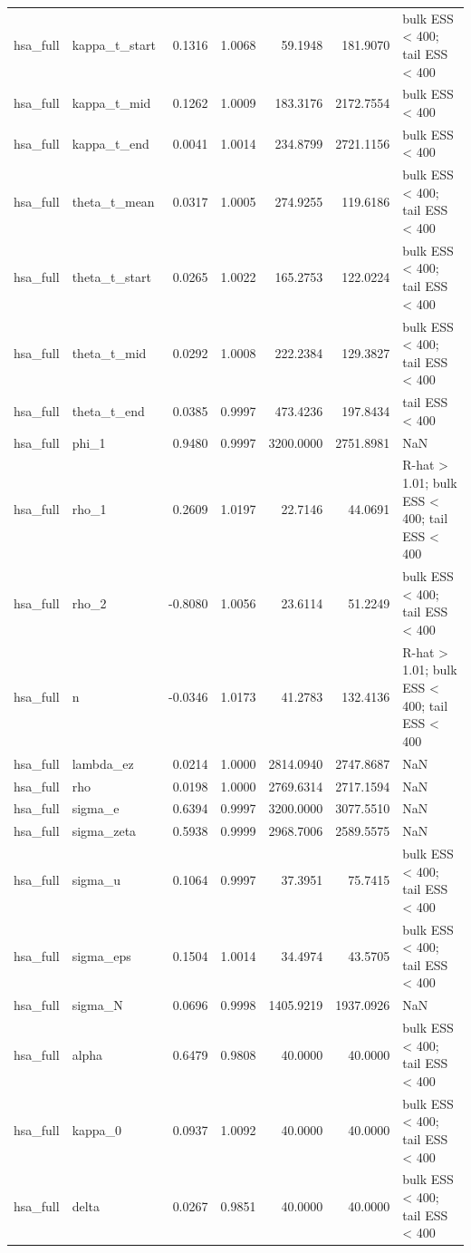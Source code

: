 \begin{tabular}{llrrrrl}
hsa\_full & kappa\_t\_start & 0.1316 & 1.0068 & 59.1948 & 181.9070 & bulk ESS < 400; tail ESS < 400 \\
hsa\_full & kappa\_t\_mid & 0.1262 & 1.0009 & 183.3176 & 2172.7554 & bulk ESS < 400 \\
hsa\_full & kappa\_t\_end & 0.0041 & 1.0014 & 234.8799 & 2721.1156 & bulk ESS < 400 \\
hsa\_full & theta\_t\_mean & 0.0317 & 1.0005 & 274.9255 & 119.6186 & bulk ESS < 400; tail ESS < 400 \\
hsa\_full & theta\_t\_start & 0.0265 & 1.0022 & 165.2753 & 122.0224 & bulk ESS < 400; tail ESS < 400 \\
hsa\_full & theta\_t\_mid & 0.0292 & 1.0008 & 222.2384 & 129.3827 & bulk ESS < 400; tail ESS < 400 \\
hsa\_full & theta\_t\_end & 0.0385 & 0.9997 & 473.4236 & 197.8434 & tail ESS < 400 \\
hsa\_full & phi\_1 & 0.9480 & 0.9997 & 3200.0000 & 2751.8981 & NaN \\
hsa\_full & rho\_1 & 0.2609 & 1.0197 & 22.7146 & 44.0691 & R-hat > 1.01; bulk ESS < 400; tail ESS < 400 \\
hsa\_full & rho\_2 & -0.8080 & 1.0056 & 23.6114 & 51.2249 & bulk ESS < 400; tail ESS < 400 \\
hsa\_full & n & -0.0346 & 1.0173 & 41.2783 & 132.4136 & R-hat > 1.01; bulk ESS < 400; tail ESS < 400 \\
hsa\_full & lambda\_ez & 0.0214 & 1.0000 & 2814.0940 & 2747.8687 & NaN \\
hsa\_full & rho & 0.0198 & 1.0000 & 2769.6314 & 2717.1594 & NaN \\
hsa\_full & sigma\_e & 0.6394 & 0.9997 & 3200.0000 & 3077.5510 & NaN \\
hsa\_full & sigma\_zeta & 0.5938 & 0.9999 & 2968.7006 & 2589.5575 & NaN \\
hsa\_full & sigma\_u & 0.1064 & 0.9997 & 37.3951 & 75.7415 & bulk ESS < 400; tail ESS < 400 \\
hsa\_full & sigma\_eps & 0.1504 & 1.0014 & 34.4974 & 43.5705 & bulk ESS < 400; tail ESS < 400 \\
hsa\_full & sigma\_N & 0.0696 & 0.9998 & 1405.9219 & 1937.0926 & NaN \\
hsa\_full & alpha & 0.6479 & 0.9808 & 40.0000 & 40.0000 & bulk ESS < 400; tail ESS < 400 \\
hsa\_full & kappa\_0 & 0.0937 & 1.0092 & 40.0000 & 40.0000 & bulk ESS < 400; tail ESS < 400 \\
hsa\_full & delta & 0.0267 & 0.9851 & 40.0000 & 40.0000 & bulk ESS < 400; tail ESS < 400 \\

\end{tabular}
